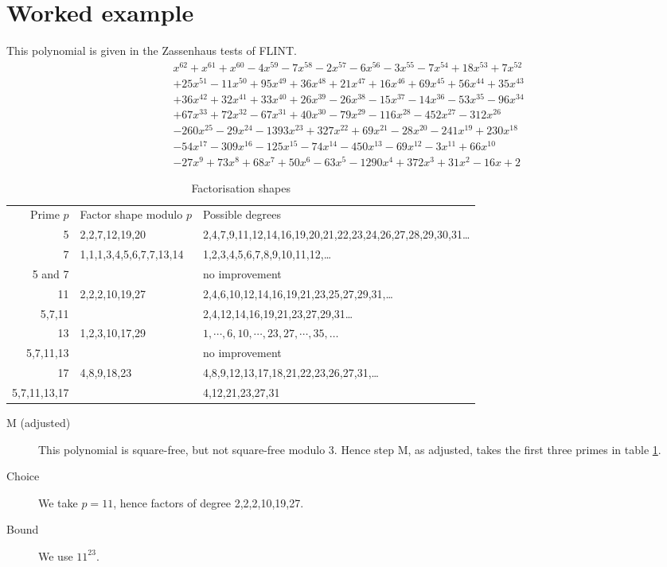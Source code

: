 \documentclass{llncs}
\begin{document}
\section{Worked example}
This polynomial is given in the Zassenhaus tests of FLINT.
\begin{equation}
\begin{array}{l}
x^{62}+x^{61}+x^{60}-4 x^{59}-7 x^{58}-2 x^{57}-6 x^{56}-3 x^{55}-7 x^{54}+18 x^{53}+7 x^{52}\\+25 x^{51}-11 x^{50}+95 x^{49}+36 x^{48}+21 x^{47}+16 x^{46}+69 x^{45}+56 x^{44}+35 x^{43}\\+36 x^{42}+32 x^{41}+33 x^{40}+26 x^{39}-26 x^{38}-15 x^{37}-14 x^{36}-53 x^{35}-96 x^{34}\\+67 x^{33}+72 x^{32}-67 x^{31}+40 x^{30}-79 x^{29}-116 x^{28}-452 x^{27}-312 x^{26}\\-260 x^{25}-29 x^{24}-1393 x^{23}+327 x^{22}+69 x^{21}-28 x^{20}-241 x^{19}+230 x^{18}\\-54 x^{17}-309 x^{16}-125 x^{15}-74 x^{14}-450 x^{13}-69 x^{12}-3 x^{11}+66 x^{10}\\-27 x^{9}+73 x^{8}+68 x^{7}+50 x^{6}-63 x^{5}-1290 x^{4}+372 x^{3}+31 x^{2}-16 x +2
\end{array}
\end{equation}
\begin{table}
\caption{Factorisation shapes\label{tab:CZ}}
\begin{tabular}{rll}
Prime $p$\quad&Factor shape modulo $p$&Possible degrees\\
5&2,2,7,12,19,20&2,4,7,9,11,12,14,16,19,20,21,22,23,24,26,27,28,29,30,31\dots\\
7&1,1,1,3,4,5,6,7,7,13,14&1,2,3,4,5,6,7,8,9,10,11,12,\dots\\
5 and 7&&no improvement\\
11&2,2,2,10,19,27&2,4,6,10,12,14,16,19,21,23,25,27,29,31,\dots\\
5,7,11&&2,4,12,14,16,19,21,23,27,29,31\dots\\
\hline
13&1,2,3,10,17,29&$1,\cdots,6,10,\cdots,23,27,\cdots,35,\ldots$\\
5,7,11,13&&no improvement\\
17&4,8,9,18,23&4,8,9,12,13,17,18,21,22,23,26,27,31,\dots\\
5,7,11,13,17&&4,12,21,23,27,31
\end{tabular}
\end{table}
\begin{description}
\item[M (adjusted)]
This polynomial is square-free, but not square-free modulo 3. Hence step M, as adjusted, takes the first three primes in table \ref{tab:CZ}.
\item[Choice]We take $p=11$, hence factors of degree 2,2,2,10,19,27. 
\item[Bound]We use $11^{23}$.  
\end{description}
\end{document}
